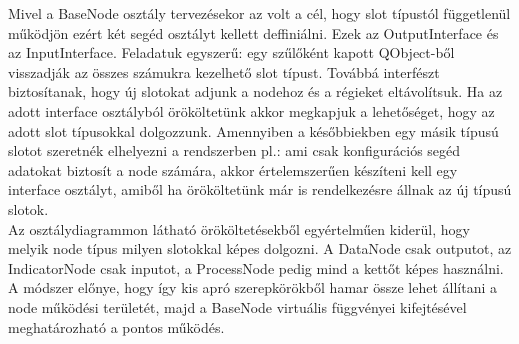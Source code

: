 \documentclass[a4paper,12pt,oneside]{report}
\begin{document}
Mivel a BaseNode osztály tervezésekor az volt a cél, hogy slot típustól függetlenül működjön ezért két segéd osztályt kellett deffiniálni. Ezek az OutputInterface és az InputInterface. Feladatuk egyszerű: egy szűlőként kapott QObject-ből visszadják az összes számukra kezelhető slot típust. Továbbá interfészt biztosítanak, hogy új slotokat adjunk a nodehoz és a régieket eltávolítsuk. Ha az adott interface osztályból örököltetünk akkor megkapjuk a lehetőséget, hogy az adott slot típusokkal dolgozzunk. Amennyiben a későbbiekben egy másik típusú slotot szeretnék elhelyezni a rendszerben pl.: ami csak konfigurációs segéd adatokat biztosít a node számára, akkor értelemszerűen készíteni kell egy interface osztályt, amiből ha örököltetünk már is rendelkezésre állnak az új típusú slotok.\\
Az osztálydiagrammon látható örököltetésekből egyértelműen kiderül, hogy melyik node típus milyen slotokkal képes dolgozni. A DataNode csak outputot, az IndicatorNode csak inputot, a ProcessNode pedig mind a kettőt képes használni. A módszer előnye, hogy így kis apró szerepkörökből hamar össze lehet állítani a node működési területét, majd a BaseNode virtuális függvényei kifejtésével meghatározható a pontos működés.
\end{document}
